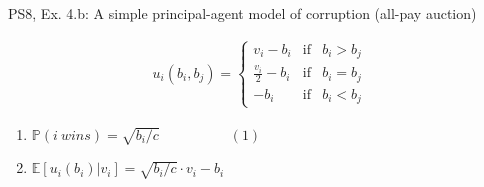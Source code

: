 \begin{frame}{PS8, Ex. 4.b: A simple principal-agent model of corruption (all-pay auction)}
\begin{multicols}{2}
\begin{align*}
        u_i(b_i,b_j)=\left\{\begin{array}{lcl}
          v_i-b_i           & \text{if} & b_i>b_j \\
          \frac{v_i}{2}-b_i & \text{if} & b_i=b_j \\
          -b_i              & \text{if} & b_i<b_j
        \end{array}\right.
      \end{align*} \vspace{-16pt}
      \begin{enumerate}
        \item $\mathbb{P}(i\ wins)=\sqrt{b_i/c}\quad\quad\quad\quad\quad(1)$
        \item $\mathbb{E}[u_i(b_i)|v_i]=\sqrt{b_i/c}\cdot v_i-b_i$
      \end{enumerate}
      \vfill\null
    \end{multicols}
\end{frame}
